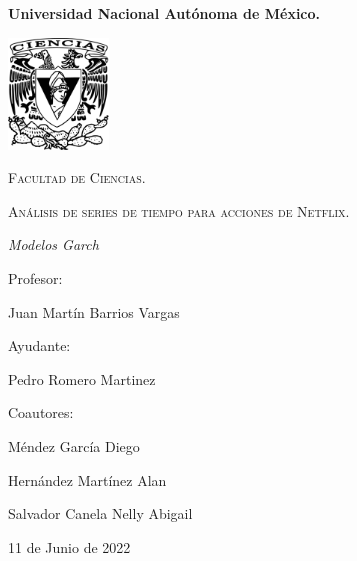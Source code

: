 \begin{titlepage}
    \centering
    {\bfseries\LARGE Universidad Nacional Autónoma de México. \par}
    \vspace{1cm}
    {\includegraphics[width=0.2\textwidth]{Graficos/logo.png}\par}
    {\scshape\Large Facultad de Ciencias. \par}
    \vspace{1cm}
    {\scshape\Huge Análisis de series de tiempo para acciones de Netflix. \par}
    \vspace{1cm}
    {\itshape\Large Modelos Garch \par}
    \vfill
    {\Large Profesor: \par}
    {\Large Juan Martín Barrios Vargas \par}
    \vfill
    {\Large Ayudante: \par}
    {\Large Pedro Romero Martinez \par}
    \vfill
    {\Large Coautores: \par}
    {\Large  Méndez García Diego \par}
     {\Large  Hernández Martínez Alan \par}
      {\Large  Salvador Canela Nelly Abigail \par}
    \vfill
    {\Large 11 de Junio de 2022 \par}
\end{titlepage}
